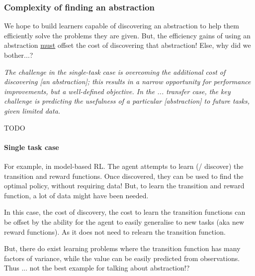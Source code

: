 
\subsubsection{Complexity of finding an abstraction}

We hope to build learners capable of discovering an abstraction to help them efficiently solve the problems they are given.
But, the efficiency gains of using an abstraction \underline{must} offset the cost of
discovering that abstraction! Else, why did we bother...?

\begin{displayquote}
\textit{The challenge in the single-task case is overcoming the additional cost of discovering [an abstraction];
this results in a narrow opportunity for performance improvements, but a well-defined objective.
In the ... transfer case, the key challenge is predicting the usefulness of a particular [abstraction] to future tasks, given limited data.}\cite{Konidaris2019}
\end{displayquote}

{\color{red}TODO}

\paragraph{Single task case}

For example, in model-based RL. The agent attempts to learn (/ discover) the
transition and reward functions. Once discovered, they can be used to find the optimal policy, without requiring data!
But, to learn the transition and reward function, a lot of data might have been needed.

In this case, the cost of discovery, the cost to learn the transition functions can be offset
by the ability for the agent to easily generalise to new tasks (aka new reward functions).
As it does not need to relearn the transition function.

But, there do exist learning problems where the transition function has many
factors of variance, while the value can be easily predicted from observations.
Thus ...
{\color{red}not the best example for talking about abstraction!?}

